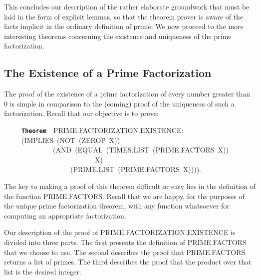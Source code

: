 \documentclass[11pt]{book}
\newenvironment{pubasis}{\begin{flushleft}\ttfamily\small}{\normalsize\rmfamily\end{flushleft}}
\newcommand{\axiomordefinition}[1]{\vspace{6pt}\texttt{\textbf{#1}}}
\newcommand{\pubdefaulttextsize}{\large}
\begin{document}
This concludes our description of the rather
elaborate groundwork that must be laid in
the form of explicit lemmas, so that the
theorem prover is aware of the facts implicit
in the ordinary definition of prime.  We now
proceed to the more interesting theorems concerning
the existence and uniqueness of the prime factorization.
\subsection{The Existence of a Prime Factorization}
\label{SSSPRIMEFACTORIZATIONEXISTENCE}
\pubdefaulttextsize
The proof of the existence of a prime factorization of
every number greater than 0 is simple in comparison
to the (coming)  proof of the uniqueness of such a factorization.
Recall that our objective is to prove:
\begin{pubasis}
~~~~~\axiomordefinition{Theorem}~~PRIME.FAC\-TOR\-I\-ZA\-TION.EXISTENCE:\\
~~~~~(IMPLIES~(NOT~(ZEROP~X))\\
~~~~~~~~~~~~~~(AND~(EQUAL~(TIMES.LIST~(PRIME.FAC\-TORS~X))\\
~~~~~~~~~~~~~~~~~~~~~~~~~~X)\\
~~~~~~~~~~~~~~~~~~~(PRIME.LIST~(PRIME.FAC\-TORS~X)))).\\
\end{pubasis}
The key to making a proof of this theorem difficult or
easy lies in the definition of the function
PRIME.FAC\-TORS.  Recall that we are happy, for
the purposes of the unique prime factorization theorem,
with any function whatsoever for computing an appropriate factorization.

Our description of the proof of PRIME.FAC\-TOR\-I\-ZA\-TION.EXISTENCE
is divided into three parts.  The first  presents the
definition of PRIME.FAC\-TORS that we choose to use.  The
second  describes the proof that PRIME.FAC\-TORS returns a
list of primes.  The third  describes the proof that
the product over that list is the desired integer.
\end{document}

